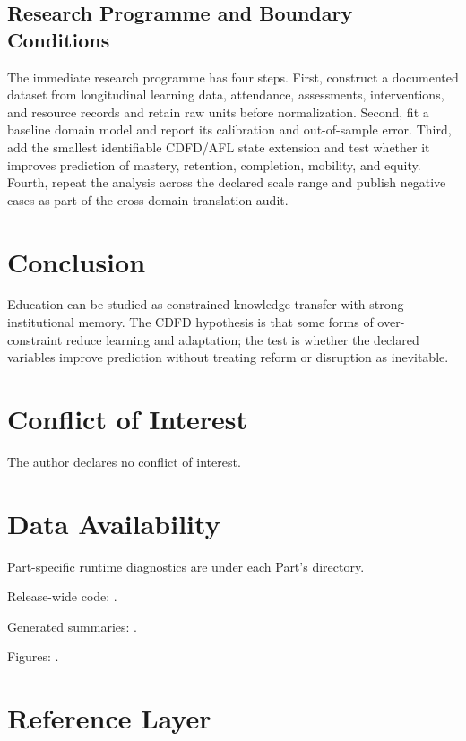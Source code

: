 \documentclass[11pt,a4paper]{article}
\begin{document}
\subsection{Research Programme and Boundary Conditions}

The immediate research programme has four steps. First, construct a documented
dataset from longitudinal learning data, attendance, assessments, interventions, and resource records and retain raw units before normalization.
Second, fit a baseline domain model and report its calibration and out-of-sample
error. Third, add the smallest identifiable CDFD/AFL state extension and test
whether it improves prediction of mastery, retention, completion, mobility, and equity. Fourth, repeat the
analysis across the declared scale range and publish negative cases as part of
the cross-domain translation audit.


\section{Conclusion}
Education can be studied as constrained knowledge transfer with strong institutional memory. The CDFD hypothesis is that some forms of over-constraint reduce learning and adaptation; the test is whether the declared variables improve prediction without treating reform or disruption as inevitable.
\section*{Conflict of Interest} The author declares no conflict of interest.
\section*{Data Availability}
Part-specific runtime diagnostics are under each Part's  directory.

Release-wide code: .

Generated summaries: .

Figures: .


\section{Reference Layer}


\end{document}
